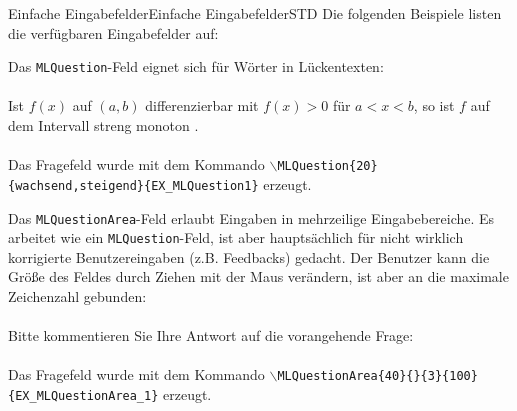 \begin{MXContent}{Einfache Eingabefelder}{Einfache Eingabefelder}{STD}
Die folgenden Beispiele listen die verfügbaren Eingabefelder auf:

\begin{MExample}
Das \texttt{MLQuestion}-Feld eignet sich für Wörter in Lückentexten:
\ \\ \ \\
Ist $f(x)$ auf $(a,b)$ differenzierbar mit $f(x)>0$ für $a<x<b$, so ist $f$ auf dem Intervall streng monoton .
\ \\ \ \\
Das Fragefeld wurde mit dem Kommando \texttt{$\backslash$MLQuestion\{20\}\{wachsend,steigend\}\{EX\_MLQuestion1\}} erzeugt.
\end{MExample}

\begin{MExample}
Das \texttt{MLQuestionArea}-Feld erlaubt Eingaben in mehrzeilige Eingabebereiche. Es arbeitet wie ein \texttt{MLQuestion}-Feld, ist aber hauptsächlich
für nicht wirklich korrigierte Benutzereingaben (z.B. Feedbacks) gedacht. Der Benutzer kann die Größe des Feldes durch Ziehen mit der Maus verändern,
ist aber an die maximale Zeichenzahl gebunden:
\ \\ \ \\
Bitte kommentieren Sie Ihre Antwort auf die vorangehende Frage:\\

\ \\
Das Fragefeld wurde mit dem Kommando \texttt{$\backslash$MLQuestionArea\{40\}\{\}\{3\}\{100\}\{EX\_MLQuestionArea\_1\}} erzeugt.
\end{MExample}


\end{MXContent}
